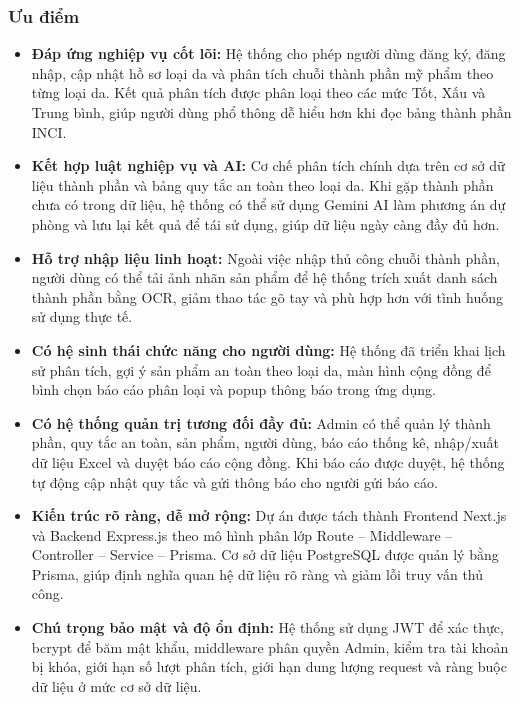 \documentclass[12pt,a4paper]{article}
\begin{document}
\subsubsection{Ưu điểm}

\begin{itemize}
    \item \textbf{Đáp ứng nghiệp vụ cốt lõi:} Hệ thống cho phép người dùng đăng ký, đăng nhập, cập nhật hồ sơ loại da và phân tích chuỗi thành phần mỹ phẩm theo từng loại da. Kết quả phân tích được phân loại theo các mức Tốt, Xấu và Trung bình, giúp người dùng phổ thông dễ hiểu hơn khi đọc bảng thành phần INCI.
    \item \textbf{Kết hợp luật nghiệp vụ và AI:} Cơ chế phân tích chính dựa trên cơ sở dữ liệu thành phần và bảng quy tắc an toàn theo loại da. Khi gặp thành phần chưa có trong dữ liệu, hệ thống có thể sử dụng Gemini AI làm phương án dự phòng và lưu lại kết quả để tái sử dụng, giúp dữ liệu ngày càng đầy đủ hơn.
    \item \textbf{Hỗ trợ nhập liệu linh hoạt:} Ngoài việc nhập thủ công chuỗi thành phần, người dùng có thể tải ảnh nhãn sản phẩm để hệ thống trích xuất danh sách thành phần bằng OCR, giảm thao tác gõ tay và phù hợp hơn với tình huống sử dụng thực tế.
    \item \textbf{Có hệ sinh thái chức năng cho người dùng:} Hệ thống đã triển khai lịch sử phân tích, gợi ý sản phẩm an toàn theo loại da, màn hình cộng đồng để bình chọn báo cáo phân loại và popup thông báo trong ứng dụng.
    \item \textbf{Có hệ thống quản trị tương đối đầy đủ:} Admin có thể quản lý thành phần, quy tắc an toàn, sản phẩm, người dùng, báo cáo thống kê, nhập/xuất dữ liệu Excel và duyệt báo cáo cộng đồng. Khi báo cáo được duyệt, hệ thống tự động cập nhật quy tắc và gửi thông báo cho người gửi báo cáo.
    \item \textbf{Kiến trúc rõ ràng, dễ mở rộng:} Dự án được tách thành Frontend Next.js và Backend Express.js theo mô hình phân lớp Route -- Middleware -- Controller -- Service -- Prisma. Cơ sở dữ liệu PostgreSQL được quản lý bằng Prisma, giúp định nghĩa quan hệ dữ liệu rõ ràng và giảm lỗi truy vấn thủ công.
    \item \textbf{Chú trọng bảo mật và độ ổn định:} Hệ thống sử dụng JWT để xác thực, bcrypt để băm mật khẩu, middleware phân quyền Admin, kiểm tra tài khoản bị khóa, giới hạn số lượt phân tích, giới hạn dung lượng request và ràng buộc dữ liệu ở mức cơ sở dữ liệu.
\end{itemize}
\end{document}
